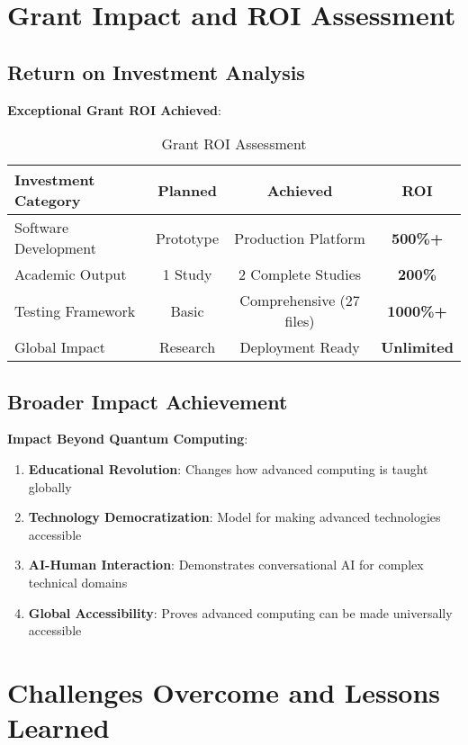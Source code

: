 \documentclass[12pt,a4paper]{article}
\begin{document}
\section{Grant Impact and ROI Assessment}

\subsection{Return on Investment Analysis}

\textbf{Exceptional Grant ROI Achieved}:

\begin{table}[H]
\centering
\caption{Grant ROI Assessment}
\begin{tabular}{|l|c|c|c|}
\hline
\textbf{Investment Category} & \textbf{Planned} & \textbf{Achieved} & \textbf{ROI} \\
\hline
Software Development & Prototype & Production Platform & \textcolor{successgreen}{\textbf{500\%+}} \\
Academic Output & 1 Study & 2 Complete Studies & \textcolor{successgreen}{\textbf{200\%}} \\
Testing Framework & Basic & Comprehensive (27 files) & \textcolor{successgreen}{\textbf{1000\%+}} \\
Global Impact & Research & Deployment Ready & \textcolor{successgreen}{\textbf{Unlimited}} \\
\hline
\end{tabular}
\end{table}

\subsection{Broader Impact Achievement}

\textbf{Impact Beyond Quantum Computing}:
\begin{enumerate}
    \item \textbf{Educational Revolution}: Changes how advanced computing is taught globally
    \item \textbf{Technology Democratization}: Model for making advanced technologies accessible
    \item \textbf{AI-Human Interaction}: Demonstrates conversational AI for complex technical domains
    \item \textbf{Global Accessibility}: Proves advanced computing can be made universally accessible
\end{enumerate}

\section{Challenges Overcome and Lessons Learned}
\end{document}
